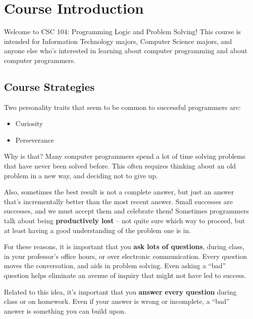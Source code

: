 
\setcounter{chapter}{0}
\chapter{Course Introduction}


\minitoc

Welcome to {\color{mLightBrown}CSC 104: Programming Logic and Problem Solving!}  This course is intended for Information Technology majors, Computer Science majors, and anyone else who's interested in learning about computer programming and about computer programmers.

\section{Course Strategies}

Two personality traits that seem to be common to successful programmers are:
\begin{itemize}
\item Curiosity
\item Perseverance
\end{itemize}

Why is that?  Many computer programmers spend a lot of time solving problems that have never been solved before.  This often requires thinking about an old problem in a new way, and deciding not to give up.

Also, sometimes the best result is not a complete answer, but just an answer that's incrementally better than the most recent answer.  Small successes are successes, and we must accept them and celebrate them!  Sometimes programmers talk about being \textbf{productively lost} -- not quite sure which way to proceed, but at least having a good understanding of the problem one is in.

For these reasons, it is important that you \textbf{ask lots of questions}, during class, in your professor's office hours, or over electronic communication.  Every question moves the conversation, and aids in problem solving.  Even asking a ``bad'' question helps eliminate an avenue of inquiry that might not have led to success.

Related to this idea, it's important that you \textbf{answer every question} during class or on homework.  Even if your answer is wrong or incomplete, a ``bad'' answer is something you can build upon.

